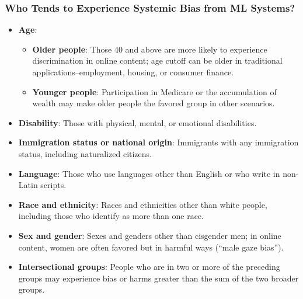 \documentclass[11pt,aspectratio=169,hyperref={colorlinks}]{beamer}
\begin{document}
		\begin{frame}				

			\frametitle{Who Tends to Experience Systemic Bias from ML Systems?}

			\begin{itemize} \small
				\item \textbf{Age}: 
				\begin{itemize} \scriptsize
					\item \textbf{Older people}: Those 40 and above are more likely to experience discrimination in online content; age cutoff can be older in traditional applications--employment, housing, or consumer finance.
					\item \textbf{Younger people}: Participation in Medicare or the accumulation of wealth may make older people the favored group in other scenarios.
				\end{itemize}
			 	\item \textbf{Disability}: Those with physical, mental, or emotional disabilities. 
				\item \textbf{Immigration status or national origin}: Immigrants with any immigration status, including naturalized citizens.
				\item \textbf{Language}: Those who use languages other than English or who write in non-Latin scripts.
				\item \textbf{Race and ethnicity}: Races and ethnicities other than white people, including those who identify as more than one race.
				\item \textbf{Sex and gender}: Sexes and genders other than cisgender men; in online content, women are often favored but in harmful ways (``male gaze bias''). 
				\item \textbf{Intersectional groups}: People who are in two or more of the preceding groups may experience bias or harms greater than the sum of the two broader groups.
			\end{itemize}
		\end{frame}	
\end{document}
